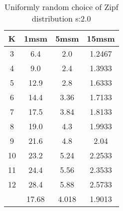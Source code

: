 \begin{table}[H]
\centering
\begin{tabular}{c|ccc}
K &1msm &5msm &15msm\\
\hline
3 & 6.4 & 2.0 & 1.2467\\
4 & 9.0 & 2.4 & 1.3933\\
5 & 12.9 & 2.8 & 1.6333\\
6 & 14.4 & 3.36 & 1.7133\\
7 & 17.5 & 3.84 & 1.8133\\
8 & 19.0 & 4.3 & 1.9933\\
9 & 21.6 & 4.8 & 2.04\\
10 & 23.2 & 5.24 & 2.2533\\
11 & 24.4 & 5.56 & 2.3533\\
12 & 28.4 & 5.88 & 2.5733\\
\hline
& 17.68 & 4.018 & 1.9013\\
\end{tabular}
\caption{Uniformly random choice of Zipf distribution s:2.0}
\label{tab:s2.0}
\end{table}
